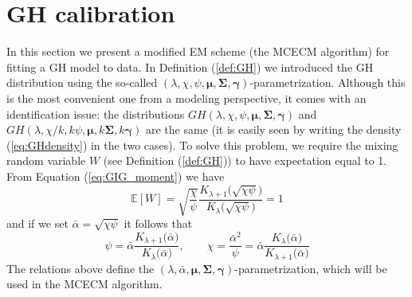 \section{GH calibration} \label{sec:GH_calibration}
In this section we present a modified EM scheme (the MCECM algorithm) for fitting a GH model to data. In Definition (\ref{def:GH}) we introduced the GH distribution using the so-called $(\lambda,\chi,\psi,\bm{\mu},\bm{\Sigma},\bm{\gamma})$-parametrization. Although this is the most convenient one from a modeling perspective, it comes with an identification issue: the distributions $GH(\lambda,\chi,\psi,\bm{\mu},\bm{\Sigma},\bm{\gamma})$ and $GH(\lambda,\chi /k,k\psi,\bm{\mu},k\bm{\Sigma},k\bm{\gamma})$ are the same (it is easily seen by writing the density (\ref{eq:GHdensity}) in the two cases). To solve this problem, we require the mixing random variable $W$ (see Definition (\ref{def:GH})) to have expectation equal to 1. From Equation (\ref{eq:GIG_moment}) we have 
\[ \mathbb{E}[W]=\sqrt{\dfrac{\chi}{\psi}}\frac{K_{\lambda+1}\big(\sqrt{\chi\psi}\big)}{K_{\lambda}\big(\sqrt{\chi\psi}\big)} = 1  \] 
and if we set $\bar{\alpha} = \sqrt{\chi\psi}$ it follows that 
\begin{equation}\label{eq:PsiChi_function_alpha}
\psi=\bar{\alpha}\frac{K_{\lambda+1}\big(\bar{\alpha}\big)}{K_{\lambda}\big(\bar{\alpha}\big)}, \qquad \chi = \frac{\bar{\alpha}^2}{\psi} = \bar{\alpha}\frac{K_{\lambda}\big(\bar{\alpha}\big)}{K_{\lambda+1}\big(\bar{\alpha}\big)}
\end{equation}
The relations above define the $(\lambda,\bar{\alpha},\bm{\mu},\bm{\Sigma},\bm{\gamma})$-parametrization, which will be used in the MCECM algorithm.

